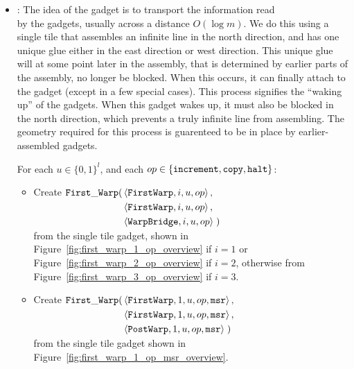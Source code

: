 \begin{itemize}
    \item {\firstwarp}: The idea of the {\firstwarp} gadget is to transport the information read\\
        by the {\cread} gadgets, usually across a distance  $O(\log m)$. We do this using a single tile that
        assembles an infinite line in the north direction, and has one unique glue either in the
        east direction or west direction. This unique glue will at some point later in the assembly, that is
        determined by earlier parts of the assembly, no longer be blocked. When this occurs, it can
        finally attach to the {\warpbridge} gadget (except in a few special cases). This process signifies the ``waking up'' of the
        {\firstwarp} gadgets. When this gadget wakes up, it must also be blocked in the north direction, which
        prevents a truly infinite line from assembling. The geometry required for this process is guarenteed
        to be in place by earlier-assembled {\dtop} gadgets.

        For each $u \in \{0, 1\}^l$, and each $op \in \{ {\tt increment}, {\tt copy}, {\tt halt} \}$:
        \begin{itemize}

            \item Create
            $\begin{aligned}[t]
                \firstwarp(& \left\langle {\tt FirstWarp},  i, u, \inc \right\rangle,\\  %
                           & \left\langle {\tt FirstWarp},  i, u, \inc \right\rangle,\\  %
                           & \left\langle {\tt WarpBridge}, i, u, \inc \right\rangle \;) %
            \end{aligned}$\\ from the single tile gadget, shown in Figure~\ref{fig:first_warp_1_op_overview}
                             if $i = 1$ or Figure~\ref{fig:first_warp_2_op_overview} if $i = 2$, otherwise from
                             Figure~\ref{fig:first_warp_3_op_overview} if $i = 3$.
            \vspace{.5cm}

            \item Create
            $\begin{aligned}[t]
                \firstwarp(& \left\langle {\tt FirstWarp}, 1, u, \inc, {\tt msr} \right\rangle, \\ %
                           & \left\langle {\tt FirstWarp}, 1, u, \inc, {\tt msr} \right\rangle, \\ %
                           & \left\langle {\tt PostWarp},  1, u, \inc, {\tt msr} \right\rangle \;) %
            \end{aligned}$\\ from the single tile gadget shown in Figure~\ref{fig:first_warp_1_op_msr_overview}.
            \vspace{.5cm}


\end{itemize}
\end{itemize}
